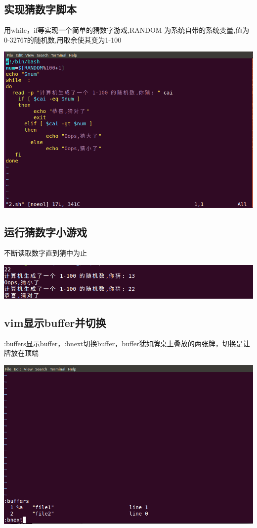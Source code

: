 \documentclass[UTF8,a4paper]{ctexart}
\begin{document}
\begin{sloppypar}
	\subsection{实现猜数字脚本}
	用while，if等实现一个简单的猜数字游戏,RANDOM 为系统自带的系统变量,值为 0‐32767的随机数,用取余使其变为1-100
	
	\includegraphics[width = 16cm]{14}
	
	\subsection{运行猜数字小游戏}
	不断读取数字直到猜中为止
	
	\includegraphics[width = 16cm]{15}
	
	\subsection{vim显示buffer并切换}
	:buffers显示buffer，:bnext切换buffer，buffer犹如牌桌上叠放的两张牌，切换是让牌放在顶端
	
	\includegraphics[width = 16cm]{16}
	

\end{sloppypar}
\end{document}

